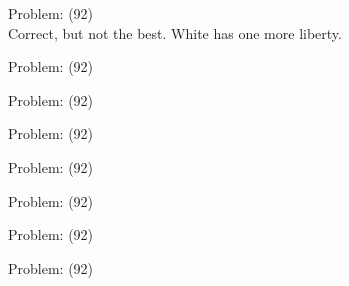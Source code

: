 \documentclass[11pt]{article}
\begin{document}
\begin{minipage}[t]{0.5\textwidth}
  {\centering
  
Problem: (92)\\
Correct, but not the best. White has one more liberty.\\
  }
\end{minipage}
\begin{minipage}[t]{0.5\textwidth}
  {\centering
  
Problem: (92)\\
  }
\end{minipage}
\begin{minipage}[t]{0.5\textwidth}
  {\centering
  
Problem: (92)\\
  }
\end{minipage}
\begin{minipage}[t]{0.5\textwidth}
  {\centering
  
Problem: (92)\\
  }
\end{minipage}
\begin{minipage}[t]{0.5\textwidth}
  {\centering
  
Problem: (92)\\
  }
\end{minipage}
\begin{minipage}[t]{0.5\textwidth}
  {\centering
  
Problem: (92)\\
  }
\end{minipage}
\begin{minipage}[t]{0.5\textwidth}
  {\centering
  
Problem: (92)\\
  }
\end{minipage}
\begin{minipage}[t]{0.5\textwidth}
  {\centering
  
Problem: (92)\\
  }
\end{minipage}
\end{document}
